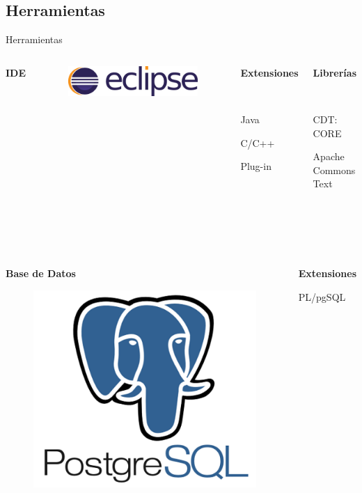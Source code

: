 \documentclass{beamer}
\begin{document}
\subsection*{Herramientas}
\begin{frame}{Herramientas}
\begin{columns}[T]

\begin{center}
\textbf{IDE}
\end{center}
\begin{figure}
\includegraphics[width=0.8\linewidth]{logo-eclipse}
\end{figure}

\begin{center}
\textbf{Extensiones}

~

Java

C/C++

Plug-in
\end{center}
\begin{center}
\textbf{Librerías}

~

CDT: CORE

Apache Commons Text
\end{center}
\end{columns}

~

~

\begin{columns}[T]

\begin{center}
\textbf{Base de Datos}
\begin{figure}
\includegraphics[width=0.37\linewidth]{logo-psql}
\end{figure}
\end{center}
\begin{center}
\textbf{Extensiones}

PL/pgSQL
\end{center}
\end{columns}
\end{frame}
\end{document}
